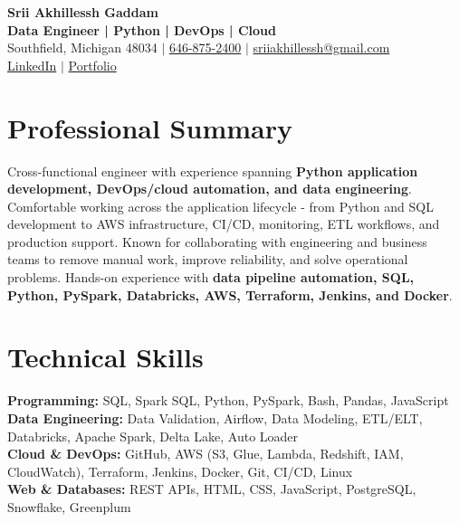 \documentclass[letterpaper,10pt]{article}
\begin{document}
\fontsize{9.35pt}{10.45pt}\selectfont

\begin{center}
    {\LARGE \textbf{Srii Akhillessh Gaddam}} \\[-1pt]
    \textbf{Data Engineer | Python | DevOps | Cloud} \\[2pt]
    Southfield, Michigan 48034 $|$
    \href{tel:6468752400}{646-875-2400} $|$
    \href{mailto:sriiakhillessh@gmail.com}{sriiakhillessh@gmail.com} \\[1pt]
    \href{https://www.linkedin.com/in/srii-akhiilessh-gaddam-b48668191/}{LinkedIn} $|$
    \href{https://sriiakhillesshg.github.io/portfolio/}{Portfolio}
\end{center}
\vspace{-8pt}

\section{Professional Summary}
\small{Cross-functional engineer with experience spanning \textbf{Python application development, DevOps/cloud automation, and data engineering}. Comfortable working across the application lifecycle - from Python and SQL development to AWS infrastructure, CI/CD, monitoring, ETL workflows, and production support. Known for collaborating with engineering and business teams to remove manual work, improve reliability, and solve operational problems. Hands-on experience with \textbf{data pipeline automation, SQL, Python, PySpark, Databricks, AWS, Terraform, Jenkins, and Docker}.}

\section{Technical Skills}
\small{
\textbf{Programming:} SQL, Spark SQL, Python, PySpark, Bash, Pandas, JavaScript \\
\textbf{Data Engineering:} Data Validation, Airflow, Data Modeling, ETL/ELT, Databricks, Apache Spark, Delta Lake, Auto Loader \\
\textbf{Cloud \& DevOps:} GitHub, AWS (S3, Glue, Lambda, Redshift, IAM, CloudWatch), Terraform, Jenkins, Docker, Git, CI/CD, Linux \\
\textbf{Web \& Databases:} REST APIs, HTML, CSS, JavaScript, PostgreSQL, Snowflake, Greenplum
}

\end{document}
